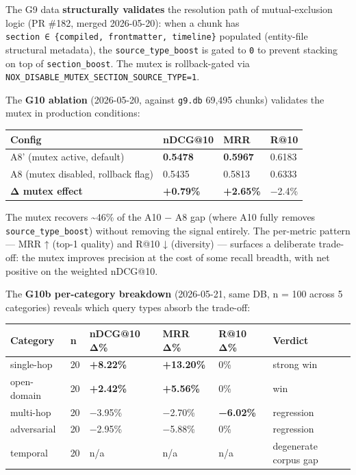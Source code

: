 \documentclass[
]{article}
\newcounter{none} %
\begin{document}
The G9 data \textbf{structurally validates} the resolution path of
mutual-exclusion logic (PR \#182, merged 2026-05-20): when a chunk has
\texttt{section\ ∈\ \{compiled,\ frontmatter,\ timeline\}} populated
(entity-file structural metadata), the \texttt{source\_type\_boost} is
gated to \texttt{0} to prevent stacking on top of
\texttt{section\_boost}. The mutex is rollback-gated via
\texttt{NOX\_DISABLE\_MUTEX\_SECTION\_SOURCE\_TYPE=1}.

The \textbf{G10 ablation} (2026-05-20, against \texttt{g9.db} 69,495
chunks) validates the mutex in production conditions:

{\def\LTcaptype{none} %
\begin{longtable}[]{@{}llll@{}}
\toprule\noalign{}
Config & nDCG@10 & MRR & R@10 \\
\midrule\noalign{}
\endhead
\bottomrule\noalign{}
\endlastfoot
A8' (mutex active, default) & \textbf{0.5478} & \textbf{0.5967} &
0.6183 \\
A8 (mutex disabled, rollback flag) & 0.5435 & 0.5813 & 0.6333 \\
\textbf{Δ mutex effect} & \textbf{+0.79\%} & \textbf{+2.65\%} &
−2.4\% \\
\end{longtable}
}

The mutex recovers \textasciitilde46\% of the A10 − A8 gap (where A10
fully removes \texttt{source\_type\_boost}) without removing the signal
entirely. The per-metric pattern --- MRR ↑ (top-1 quality) and R@10 ↓
(diversity) --- surfaces a deliberate trade-off: the mutex improves
precision at the cost of some recall breadth, with net positive on the
weighted nDCG@10.

The \textbf{G10b per-category breakdown} (2026-05-21, same DB, n = 100
across 5 categories) reveals which query types absorb the trade-off:

{\def\LTcaptype{none} %
\begin{longtable}[]{@{}llllll@{}}
\toprule\noalign{}
Category & n & nDCG@10 Δ\% & MRR Δ\% & R@10 Δ\% & Verdict \\
\midrule\noalign{}
\endhead
\bottomrule\noalign{}
\endlastfoot
single-hop & 20 & \textbf{+8.22\%} & \textbf{+13.20\%} & 0\% & strong
win \\
open-domain & 20 & \textbf{+2.42\%} & \textbf{+5.56\%} & 0\% & win \\
multi-hop & 20 & −3.95\% & −2.70\% & \textbf{−6.02\%} & regression \\
adversarial & 20 & −2.95\% & −5.88\% & 0\% & regression \\
temporal & 20 & n/a & n/a & n/a & degenerate corpus gap \\
\end{longtable}
}
\end{document}

